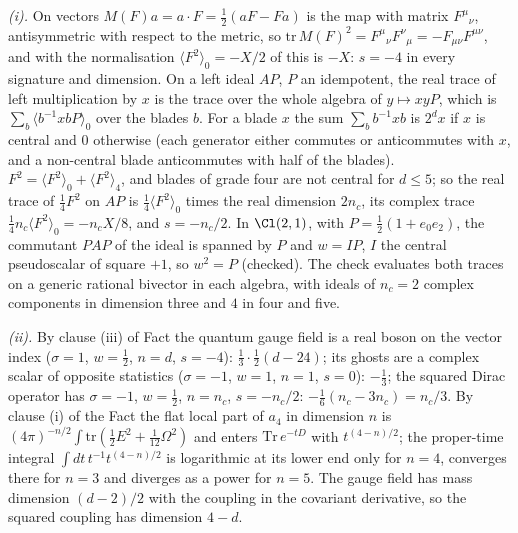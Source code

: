 \emph{(i).} On vectors $M(F)a = a\cdot F = \tfrac12(aF - Fa)$ is the map with matrix $F^{\mu}{}_{\nu}$, antisymmetric with respect to the metric, so $\mathrm{tr}\,M(F)^{2} = F^{\mu}{}_{\nu}F^{\nu}{}_{\mu} = -F_{\mu\nu}F^{\mu\nu}$, and with the normalisation $\langle F^{2}\rangle_{0} = -X/2$ of  this is $-X$: $s = -4$ in every signature and dimension. On a left ideal $AP$, $P$ an idempotent, the real trace of left multiplication by $x$ is the trace over the whole algebra of $y \mapsto xyP$, which is $\sum_{b}\langle b^{-1}xbP\rangle_{0}$ over the blades $b$. For a blade $x$ the sum $\sum_{b}b^{-1}xb$ is $2^{d}x$ if $x$ is central and $0$ otherwise (each generator either commutes or anticommutes with $x$, and a non-central blade anticommutes with half of the blades). $F^{2} = \langle F^{2}\rangle_{0} + \langle F^{2}\rangle_{4}$, and blades of grade four are not central for $d \le 5$; so the real trace of $\tfrac14F^{2}$ on $AP$ is $\tfrac14\langle F^{2}\rangle_{0}$ times the real dimension $2n_{c}$, its complex trace $\tfrac14 n_{c}\langle F^{2}\rangle_{0} = -n_{c}X/8$, and $s = -n_{c}/2$. In $\Cl(2,1)$, with $P = \tfrac12(1 + e_{0}e_{2})$, the commutant $PAP$ of the ideal is spanned by $P$ and $w = IP$, $I$ the central pseudoscalar of square $+1$, so $w^{2} = P$ (checked). The check evaluates both traces on a generic rational bivector in each algebra, with ideals of $n_{c} = 2$ complex components in dimension three and $4$ in four and five.

\emph{(ii).} By clause (iii) of Fact  the quantum gauge field is a real boson on the vector index ($\sigma = 1$, $w = \tfrac12$, $n = d$, $s = -4$): $\tfrac13\cdot\tfrac12(d - 24)$; its ghosts are a complex scalar of opposite statistics ($\sigma = -1$, $w = 1$, $n = 1$, $s = 0$): $-\tfrac13$; the squared Dirac operator has $\sigma = -1$, $w = \tfrac12$, $n = n_{c}$, $s = -n_{c}/2$: $-\tfrac16(n_{c} - 3n_{c}) = n_{c}/3$. By clause (i) of the Fact the flat local part of $a_{4}$ in dimension $n$ is $(4\pi)^{-n/2}\int\mathrm{tr}(\tfrac12E^{2} + \tfrac1{12}\Omega^{2})$ and enters $\mathrm{Tr}\,e^{-tD}$ with $t^{(4-n)/2}$; the proper-time integral $\int dt\,t^{-1}t^{(4-n)/2}$ is logarithmic at its lower end only for $n = 4$, converges there for $n = 3$ and diverges as a power for $n = 5$. The gauge field has mass dimension $(d - 2)/2$ with the coupling in the covariant derivative, so the squared coupling has dimension $4 - d$.


